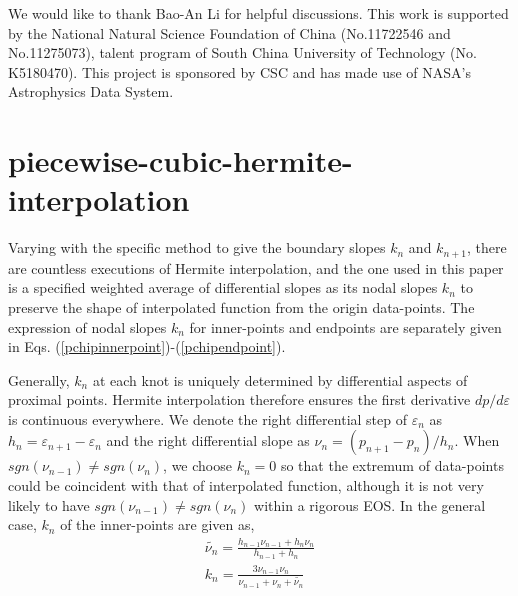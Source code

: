 \documentclass[aps,prl,a4paper,twocolumn,floats,amsmath,amssymb,nofootinbib,showpacs]{revtex4-1}
\begin{document}
\begin{acknowledgements}
We would like to thank Bao-An Li for helpful discussions. This work is supported by the National Natural Science Foundation of China (No.11722546 and No.11275073), talent program of South China University of Technology (No. K5180470). This project is sponsored by CSC and has made use of NASA's Astrophysics Data System.

\end{acknowledgements}






\appendix

\section{piecewise-cubic-hermite-interpolation}
Varying with the specific method to give the boundary slopes $k_n$ and $k_{n+1}$, there are countless executions of Hermite interpolation, and the one used in this paper is a specified weighted average of differential slopes as its nodal slopes $k_n$ to preserve the shape of interpolated function from the origin data-points. The expression of nodal slopes $k_n$ for inner-points and endpoints are separately given in Eqs. (\ref{pchipinnerpoint})-(\ref{pchipendpoint}).

Generally, $k_{n}$ at each knot is uniquely determined by differential aspects of proximal points. Hermite interpolation therefore ensures the first derivative $dp/d\varepsilon$ is continuous everywhere. We denote the right differential step of $\varepsilon_n$ as $h_n=\varepsilon_{n+1} - \varepsilon_n$ and the right differential slope as $\nu_n=(p_{n+1}-p_n)/h_n$. When $sgn(\nu_{n-1}) \ne sgn(\nu_{n})$, we choose $k_n = 0$ so that the extremum of data-points could be coincident with that of interpolated function, although it is not very likely to have $sgn(\nu_{n-1}) \ne sgn(\nu_{n})$ within a rigorous EOS. In the general case, $k_n$ of the inner-points are given as,
\begin{equation} \label{pchipinnerpoint}
\begin{array}{l}
\widetilde {{\nu _n}} = \frac{{{h_{n - 1}}{\nu _{n - 1}} + {h_n}{\nu _n}}}{{{h_{n - 1}} + {h_n}}}\\
{k_n} = \frac{{3{\nu _{n - 1}}{\nu _n}}}{{{\nu _{n - 1}} + {\nu _n} + \widetilde {{\nu _n}}}}
\end{array}
\end{equation}
\end{document}
